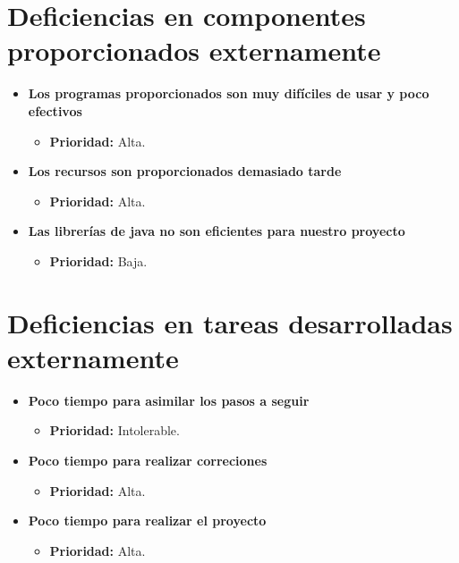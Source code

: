 \documentclass[spanish,a4paper,11pt, twoside]{report}	%
\begin{document}
\section{Deficiencias en componentes proporcionados externamente}
	\begin{itemize}
		
		\item \textbf{Los programas proporcionados son muy difíciles de usar y poco efectivos}	
			\begin{itemize}
				\item \textbf{Prioridad: }Alta.
			\end{itemize}
		
		\item \textbf{Los recursos son proporcionados demasiado tarde}	%
			\begin{itemize}
				\item \textbf{Prioridad: }Alta.
			\end{itemize}

		\item \textbf{Las librerías de java no son eficientes para nuestro proyecto}	
			\begin{itemize}
				\item \textbf{Prioridad: }Baja.
			\end{itemize}
	\end{itemize}
%
\section{Deficiencias en tareas desarrolladas externamente}
	\begin{itemize}
		\item \textbf{Poco tiempo para asimilar los pasos a seguir}	
			\begin{itemize}
				\item \textbf{Prioridad: }Intolerable.
			\end{itemize}

		\item \textbf{Poco tiempo para realizar correciones}	%
			\begin{itemize}
				\item \textbf{Prioridad: }Alta.
			\end{itemize}

\item \textbf{Poco tiempo para realizar el proyecto}
			\begin{itemize}
				\item \textbf{Prioridad: }Alta.
			\end{itemize}
		
	\end{itemize}
%
\end{document}
